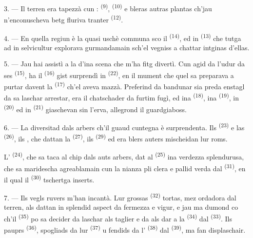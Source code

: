 3. --- Il terren era tapezzà cun : 
\textsuperscript{(9)},  \textsuperscript{(10)} e bleras autras plantas
ch'jau n'enconuscheva betg fluriva tranter  \textsuperscript{(12)}.

4. --- En quella regiun è la  quasi uschè communa sco il
 \textsuperscript{(14)}, ed in  \textsuperscript{(13)} che
tutga ad in selvicultur explorava gurmandamain sch'el vegniss a chattar intginas
d'ellas.

\VUsaut{3.0mm}
\VUsaut{3.0mm}

5. --- Jau hai assistì a la  d'ina scena che m'ha fitg divertì. Cun agid
da l'udur da ses  \textsuperscript{(15)}, ha il 
\textsuperscript{(16)} gist surprendì in 
\textsuperscript{(22)}, en il mument che quel sa preparava a purtar davent la
 \textsuperscript{(17)} ch'el aveva mazzà. Preferind da bandunar sia
preda enstagl da sa laschar arrestar, era il chatschader da furtim fugì, ed ina
 \textsuperscript{(18)}, ina  \textsuperscript{(19)}, in
 \textsuperscript{(20)} ed in  \textsuperscript{(21)}
giaschevan sin l'erva, allegrond il guardgiaboss.

6. --- La diversitad dals arbers ch'il guaud cuntegna è surprendenta. Ils
 \textsuperscript{(23)} e las  \textsuperscript{(26)}, ils
, che dattan la  \textsuperscript{(27)}, ils 
\textsuperscript{(29)} ed era blers auters mischeidan lur roms.

L' \textsuperscript{(24)}, che sa taca al chip dals auts arbers, dat al
 \textsuperscript{(25)} ina verdezza splendurusa, che sa maridescha
agreablamain cun la nianza pli clera e pallid verda dal 
\textsuperscript{(31)}, en il qual il  \textsuperscript{(30)} tschertga
inserts.

\VUsaut{3.0mm}
\VUsaut{3.0mm}

7. --- Ils vegls ruvers m'han incantà. Lur grossas 
\textsuperscript{(32)} tortas, mez ordadora dal terren, als dattan in splendid aspect
da fermezza e vigur, e jau ma dumond co ch'il  \textsuperscript{(35)}
po sa decider da laschar als taglier e da als dar a la 
\textsuperscript{(34)} dal  \textsuperscript{(33)}. Ils pauprs
 \textsuperscript{(36)}, spogliads da lur 
\textsuperscript{(37)} u fendids da l' \textsuperscript{(38)} dal
 \textsuperscript{(39)}, ma fan displaschair.


